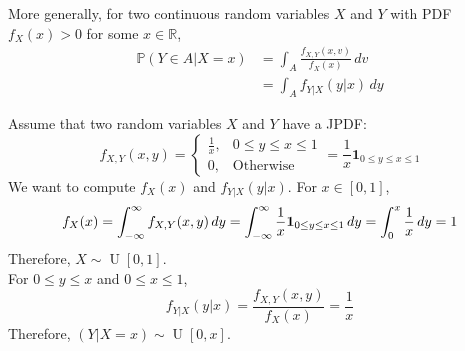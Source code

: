 \documentclass{huhtakm-template-book}
\newcommand{\prob}{\mathbb{P}}
\DeclareMathOperator{\U}{U}
\begin{document}
    \newpage
    \begin{rem}
        More generally, for two continuous random variables $X$ and $Y$ with PDF  $f_{X}(x)>0$ for some $x\in\mathbb{R}$,
        \begin{align*}
            \prob(Y\in A|X=x)&=\int_{A}\frac{f_{X,Y}(x,v)}{f_{X}(x)}\,dv\\
            &=\int_{A}f_{Y|X}(y|x)\,dy
        \end{align*}
    \end{rem}
    \begin{eg}
        \label{j.p.d.f. to con.d.f. example}
        Assume that two random variables $X$ and $Y$ have a JPDF:
        \begin{equation*}
            f_{X,Y}(x,y)=\begin{cases}
                \frac{1}{x}, &0\leq y\leq x\leq 1\\
                0, &\text{Otherwise}
            \end{cases}=\frac{1}{x}\mathbf{1}_{0\leq y\leq x\leq 1}
        \end{equation*}
        We want to compute $f_{X}(x)$ and $f_{Y|X}(y|x)$.
        For $x\in [0,1]$,
        \begin{equation*}
            f_{X}(x)=\int_{-\infty}^{\infty} f_{X,Y}(x,y)\,dy=\int_{-\infty}^{\infty}\frac{1}{x}\mathbf{1}_{0\leq y\leq x\leq 1}\,dy=\int_{0}^{x}\frac{1}{x}\,dy=1
        \end{equation*}
        Therefore, $X\sim\U[0,1]$.\\
        For $0\leq y\leq x$ and $0\leq x\leq 1$,
        \begin{equation*}
            f_{Y|X}(y|x)=\frac{f_{X,Y}(x,y)}{f_{X}(x)}=\frac{1}{x}
        \end{equation*}
        Therefore, $(Y|X=x)\sim\U[0,x]$.
    \end{eg}
\end{document}
